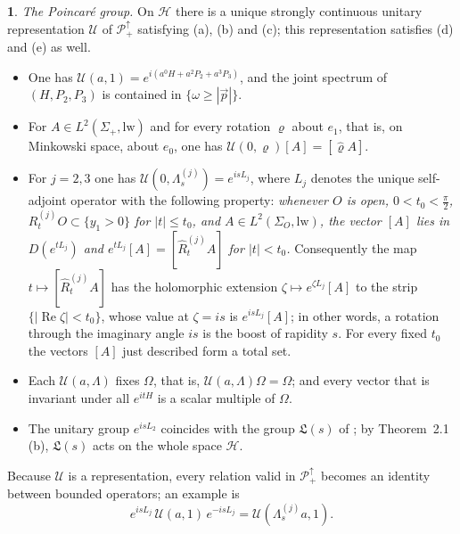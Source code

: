 \documentclass[11pt]{amsart}
\newcommand{\namedhead}{}
\theoremstyle{definition}
\newtheorem*{namedinner}{\namedhead}
\newenvironment{named}[1]{\renewcommand{\namedhead}{#1}\begin{namedinner}}{\end{namedinner}}
\begin{document}
\begin{named}{Theorem 3.2}
\emph{The Poincar\'e group.}
On $\mathcal H$ there is a unique strongly continuous unitary representation $\mathcal U$ of $\mathcal P_+^\uparrow$ satisfying (a), (b) and (c); this representation satisfies (d) and (e) as well.
\begin{itemize}
\item[(a)] One has $\mathcal U(a,1)=e^{i(a^0H+a^2P_2+a^3P_3)}$, and the joint spectrum of $(H,P_2,P_3)$ is contained in $\{\omega\ge|\vec p|\}$.
\item[(b)] For $A\in L^2(\Sigma_+,\mathrm{lw})$ and for every rotation $\varrho$ about $e_1$, that is, on Minkowski space, about $e_0$, one has $\mathcal U(0,\varrho)[A]=[\hat\varrho A]$.
\item[(c)] For $j=2,3$ one has $\mathcal U(0,\Lambda^{(j)}_s)=e^{isL_j}$, where $L_j$ denotes the unique self-adjoint operator with the following property: \emph{whenever $O$ is open, $0<t_0<\frac\pi2$, $R^{(j)}_tO\subset\{y_1>0\}$ for $|t|\le t_0$, and $A\in L^2(\Sigma_O,\mathrm{lw})$, the vector $[A]$ lies in $D(e^{tL_j})$ and $e^{tL_j}[A]=[\hat R^{(j)}_tA]$ for $|t|<t_0$.}
Consequently the map $t\mapsto[\hat R^{(j)}_tA]$ has the holomorphic extension $\zeta\mapsto e^{\zeta L_j}[A]$ to the strip $\{|\operatorname{Re}\zeta|<t_0\}$, whose value at $\zeta=is$ is $e^{isL_j}[A]$; in other words, a rotation through the imaginary angle $is$ is the boost of rapidity $s$.
For every fixed $t_0$ the vectors $[A]$ just described form a total set.
\item[(d)] Each $\mathcal U(a,\Lambda)$ fixes $\Omega$, that is, $\mathcal U(a,\Lambda)\Omega=\Omega$; and every vector that is invariant under all $e^{itH}$ is a scalar multiple of $\Omega$.
\item[(e)] The unitary group $e^{isL_2}$ coincides with the group $\mathfrak L(s)$ of \cite[Proposition~14.47\,(c)]{QEDII}; by Theorem~2.1\,(b), $\mathfrak L(s)$ acts on the whole space $\mathcal H$.
\end{itemize}
\end{named}

Because $\mathcal U$ is a representation, every relation valid in $\mathcal P_+^\uparrow$ becomes an identity between bounded operators; an example is
\begin{equation*}
e^{isL_j}\,\mathcal U(a,1)\,e^{-isL_j}=\mathcal U(\Lambda^{(j)}_sa,1).
\end{equation*}
\end{document}

